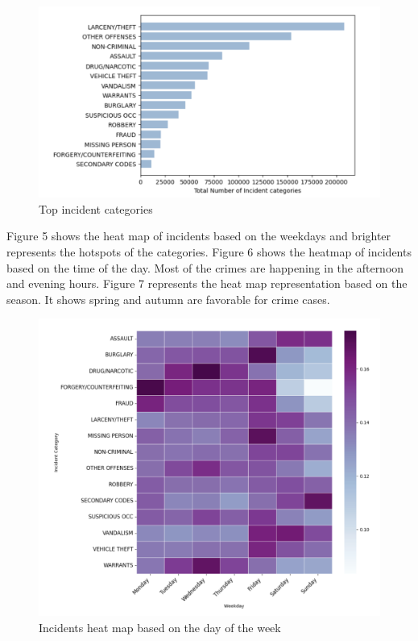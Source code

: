 \documentclass[11 pt,conference,final,]{IEEEtran}
\begin{document}
\begin{figure}

{\centering \includegraphics[width=0.7\linewidth]{img/fig4} 

}

\caption{Top incident categories}\label{fig:unnamed-chunk-4}
\end{figure}

Figure 5 shows the heat map of incidents based on the weekdays and
brighter represents the hotspots of the categories. Figure 6 shows the
heatmap of incidents based on the time of the day. Most of the crimes
are happening in the afternoon and evening hours. Figure 7 represents
the heat map representation based on the season. It shows spring and
autumn are favorable for crime cases.

\begin{figure}

{\centering \includegraphics[width=0.7\linewidth]{img/fig5} 

}

\caption{Incidents heat map based on the day of the week}\label{fig:unnamed-chunk-5}
\end{figure}
\end{document}
